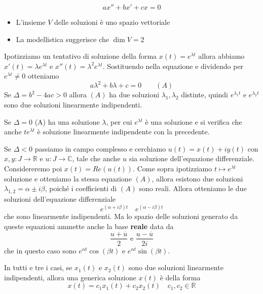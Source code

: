 \begin{example}
    \[
        ax'' + bx' + cx = 0
    \]
\begin{remark}
\begin{itemize}[label = --]
    \item L'insieme \(V\) delle soluzioni è uno spazio vettoriale
    \item La modellistica suggerisce che \(\dim V = 2\) 
\end{itemize}
    Ipotizziamo un tentativo di soluzione della forma \(x(t) = e^{\lambda t}\) 
    allora abbiamo \(x'(t) = \lambda e^{\lambda t}\) e \(x''(t) = \lambda^2
    e^{\lambda t}\). Sostituendo nella equazione e dividendo per \(e^{\lambda
    t} \neq 0\) otteniamo
    \[
        a\lambda^2 + b\lambda + c = 0 \quad \quad (A)
    \]
    Se \(\Delta = b^2 - 4ac > 0\) allora \((A)\) ha due soluzioni \(\lambda_{1},
    \lambda_{2}\) distinte, quindi \(e^{\lambda_{1} t}\) e \(e^{\lambda_{2} t}\)
    sono due soluzioni linearmente indipendenti.

    Se \(\Delta = 0\) (A) ha una soluzione \(\lambda\), per cui \(e^{\lambda
    t}\) è una soluzione e si verifica che anche \(te^{\lambda t}\) è soluzione
    linearmente indipendente con la precedente.

    Se \(\Delta < 0\) passiamo in campo complesso e cerchiamo \(u(t) = x(t) +
    iy(t)\) con \(x, y : J \to \mathbb{R}\) e \(u : J \to \mathbb{C}\), tale che
    anche \(u\) sia soluzione dell'equazione differenziale. Considereremo poi
    \(x(t) = Re(u(t))\). Come sopra ipotizziamo \(t \mapsto e^{\lambda t}\)
    soluzione e otteniamo la stessa equazione \((A)\), allora esistono due
    soluzioni \(\lambda_{1, 2} = \alpha \pm i\beta \), poiché i coefficienti di
    \((A)\) sono reali. Allora otteniamo le due soluzioni dell'equazione
    differenziale
    \[
        e^{(\alpha + i\beta)t} \quad e^{(\alpha - i\beta)t}
    \]
    che sono linearmente indipendenti. Ma lo spazio delle soluzioni generato da
    queste equazioni ammette anche la base \textbf{reale} data da 
    \[
        \frac{u + \overline{u}}{2} \text{ e } \frac{u - \overline{u}}{2i}
    \]
    che in questo caso sono \(e^{\alpha t}\cos(\beta t)\) e \(e^{\alpha t}
    \sin(\beta t)\).

    In tutti e tre i casi, se \(x_{1}(t)\) e \(x_{2}(t)\) sono due soluzioni
    linearmente indipendenti, allora una generica soluzione \(x(t)\) è della
    forma 
    \[
        x(t) = c_{1}x_{1}(t) + c_{2}x_{2}(t) \quad c_{1}, c_{2} \in \mathbb{R}
    \]


\end{remark}
\end{example}
